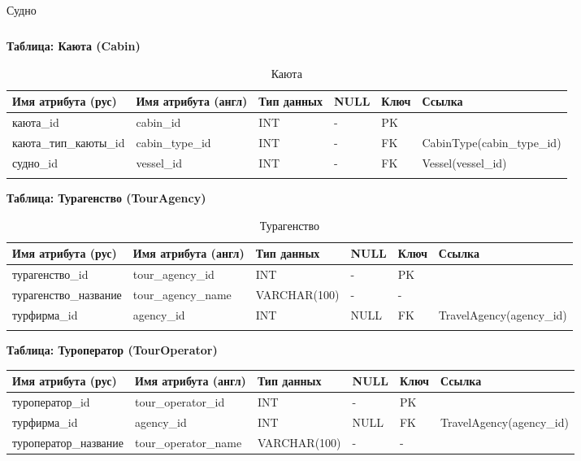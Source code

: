\documentclass[11pt,a4paper,final]{article}
\begin{document}
\begin{landscape}
\begin{longtable}{|p{4.2cm}|p{3.3cm}|p{2.6cm}|p{1cm}|p{1cm}|p{5cm}|}
\caption{Судно}
\end{longtable}

\newpage
    \ClearShipoutPicture %
    \thispagestyle{empty}
\textbf{Таблица: Каюта (Cabin)}

\begin{longtable}{|p{4cm}|p{3cm}|p{1cm}|p{1cm}|p{1cm}|p{5cm}|}
\hline
Имя атрибута (рус) & Имя атрибута (англ) & Тип данных & NULL & Ключ & Ссылка \\ \hline
\endhead

каюта\_id & cabin\_id & INT & - & PK & \\ \hline
каюта\_тип\_каюты\_id & cabin\_type\_id & INT & - & FK & CabinType(cabin\_type\_id) \\ \hline
судно\_id & vessel\_id & INT & - & FK & Vessel(vessel\_id) \\ \hline

\caption{Каюта}
\end{longtable}

\textbf{Таблица: Турагенство (TourAgency)}

\begin{longtable}{|p{4cm}|p{3.2cm}|p{2.6cm}|p{1cm}|p{1cm}|p{4.3cm}|}
\hline
Имя атрибута (рус) & Имя атрибута (англ) & Тип данных & NULL & Ключ & Ссылка \\ \hline
\endhead

турагенство\_id & tour\_agency\_id & INT & - & PK & \\ \hline
турагенство\_название & tour\_agency\_name & VARCHAR(100) & - & - & \\ \hline
турфирма\_id & agency\_id & INT & NULL & FK & TravelAgency(agency\_id) \\ \hline

\caption{Турагенство}
\end{longtable}

\textbf{Таблица: Туроператор (TourOperator)}

\begin{longtable}{|p{4cm}|p{3.4cm}|p{2.6cm}|p{1cm}|p{1cm}|p{4.2cm}|}
\hline
Имя атрибута (рус) & Имя атрибута (англ) & Тип данных & NULL & Ключ & Ссылка \\ \hline
\endhead

туроператор\_id & tour\_operator\_id & INT & - & PK & \\ \hline
турфирма\_id & agency\_id & INT & NULL & FK & TravelAgency(agency\_id) \\ \hline
туроператор\_название & tour\_operator\_name & VARCHAR(100) & - & - & \\ \hline


\end{longtable}
\end{landscape}
\end{document}
